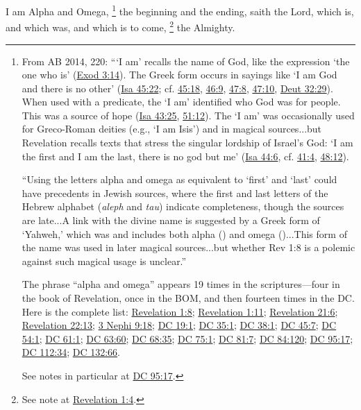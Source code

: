 			I am Alpha and Omega,%
				\footnote{%
					From AB 2014, 220: ```I am' recalls the name of God, like the expression `the one who is' (\hyperref[EXODUS-3-14]{Exod 3:14}). The Greek form  occurs in sayings like `I am God and there is no other' (\hyperref[ISAIAH-45-22]{Isa 45:22}; cf. \hyperref[ISAIAH-45-18]{45:18}, \hyperref[ISAIAH-46-9]{46:9}, \hyperref[ISAIAH-47-8]{47:8}, \hyperref[ISAIAH-47-10]{47:10}, \hyperref[DEUTERONOMY-32-39]{Deut 32:29}). When used with a predicate, the `I am' identified who God was for people. This was a source of hope (\hyperref[ISAIAH-43-25]{Isa 43:25}, \hyperref[ISAIAH-51-12]{51:12}). The `I am' was occasionally used for Greco-Roman deities (e.g., `I am Isis') and in magical sources...but Revelation recalls texts that stress the singular lordship of Israel's God: `I am the first and I am the last, there is no god but me' (\hyperref[ISAIAH-44-6]{Isa 44:6}, cf. \hyperref[ISAIAH-41-4]{41:4}, \hyperref[ISAIAH-48-12]{48:12}).
					
					``Using the letters alpha and omega as equivalent to `first' and `last' could have precedents in Jewish sources, where the first and last letters of the Hebrew alphabet (\textit{aleph} and \textit{tau}) indicate completeness, though the sources are late...A link with the divine name is suggested by a Greek form of `Yahweh,' which was  and includes both alpha () and omega ()...This form of the name was used in later magical sources...but whether Rev 1:8 is a polemic against such magical usage is unclear.''
					
					The phrase ``alpha and omega'' appears 19 times in the scriptures---four in the book of Revelation, once in the BOM, and then fourteen times in the DC. Here is the complete list: \hyperref[REVELATIONNT-1-8]{Revelation 1:8}; \hyperref[REVELATIONNT-1-11]{Revelation 1:11}; \hyperref[REVELATIONNT-21-6]{Revelation 21:6}; \hyperref[REVELATIONNT-22-13]{Revelation 22:13}; \hyperref[3NEPHI-9-18]{3 Nephi 9:18}; \hyperref[DC19-1]{DC 19:1}; \hyperref[DC35-1]{DC 35:1}; \hyperref[DC38-1]{DC 38:1}; \hyperref[DC45-7]{DC 45:7}; \hyperref[DC54-1]{DC 54:1}; \hyperref[DC61-1]{DC 61:1}; \hyperref[DC63-60]{DC 63:60}; \hyperref[DC68-35]{DC 68:35}; \hyperref[DC75-1]{DC 75:1}; \hyperref[DC81-7]{DC 81:7}; \hyperref[DC84-120]{DC 84:120}; \hyperref[DC95-17]{DC 95:17}; \hyperref[DC112-34]{DC 112:34}; \hyperref[DC132-66]{DC 132:66}.
					
					See notes in particular at \hyperref[DC95-17]{DC 95:17}.
					}
			the beginning and the ending, saith the Lord, which is, and which was, and which is to come,%
				\footnote{%
					See note at \hyperref[REVELATIONNT-1-4]{Revelation 1:4}.
					}
			the Almighty.

